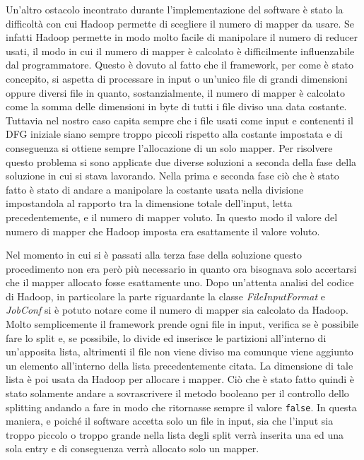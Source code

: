 \documentclass[]{IEEEtran}
\begin{document}
Un'altro ostacolo incontrato durante l'implementazione del software è stato la difficoltà con cui Hadoop permette di scegliere il numero di mapper da usare. Se infatti Hadoop permette in modo molto facile di manipolare il numero di reducer usati, il modo in cui il numero di mapper è calcolato è difficilmente influenzabile dal programmatore. Questo è dovuto al fatto che il framework, per come è stato concepito, si aspetta di processare in input o un'unico file di grandi dimensioni oppure diversi file in quanto, sostanzialmente, il numero di mapper è calcolato come la somma delle dimensioni in byte di tutti i file diviso una data costante. Tuttavia nel nostro caso capita sempre che i file usati come input e contenenti il DFG iniziale siano sempre troppo piccoli rispetto alla costante impostata e di conseguenza si ottiene sempre l'allocazione di un solo mapper. Per risolvere questo problema si sono applicate due diverse soluzioni a seconda della fase della soluzione in cui si stava lavorando. Nella prima e seconda fase ciò che è stato fatto è stato di andare a manipolare la costante usata nella divisione impostandola al rapporto tra la dimensione totale dell'input, letta precedentemente, e il numero di mapper voluto. In questo modo il valore del numero di mapper che Hadoop imposta era esattamente il valore voluto.

Nel momento in cui si è passati alla terza fase della soluzione questo procedimento non era però più necessario in quanto ora bisognava solo accertarsi che il mapper allocato fosse esattamente uno. Dopo un'attenta analisi del codice di Hadoop, in particolare la parte riguardante la classe \emph{FileInputFormat}\cite{FILEINPUTFORMAT} e \emph{JobConf}\cite{JOBCONF} si è potuto notare come il numero di mapper sia calcolato da Hadoop. Molto semplicemente il framework prende ogni file in input, verifica se è possibile fare lo split e, se possibile, lo divide ed inserisce le partizioni all'interno di un'apposita lista, altrimenti il file non viene diviso ma comunque viene aggiunto un elemento all'interno della lista precedentemente citata. La dimensione di tale lista è poi usata da Hadoop per allocare i mapper. Ciò che è stato fatto quindi è stato solamente andare a sovrascrivere il metodo booleano per il controllo dello splitting andando a fare in modo che ritornasse sempre il valore \texttt{false}. In questa maniera, e poiché il software accetta solo un file in input, sia che l'input sia troppo piccolo o troppo grande nella lista degli split verrà inserita una ed una sola entry e di conseguenza verrà allocato solo un mapper.
\end{document}

